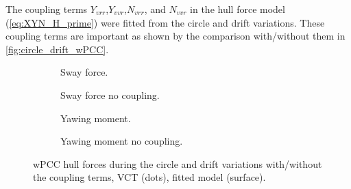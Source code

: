 The coupling terms $Y_{vrr}$,$Y_{vvr}$,$N_{vrr}$, and $N_{vvr}$ in the hull force model (\autoref{eq:XYN_H_prime}) were fitted from the circle and drift variations. These coupling terms are important as shown by the comparison with/without them in \autoref{fig:circle_drift_wPCC}.
\begin{figure}[h]
     \centering
     \begin{subfigure}[b]{0.49\textwidth}
         \centering
         
        \caption{Sway force.}
        \label{fig:circle_drift_Y_H_wPCC}
     \end{subfigure}
     \hfill
     \begin{subfigure}[b]{0.49\textwidth}
         \centering
         
        \caption{Sway force no coupling.}
        \label{fig:circle_drift_Y_H_no_coupling_wPCC}
     \end{subfigure}

     \vfill
     \begin{subfigure}[b]{0.49\textwidth}
         \centering
         
        \caption{Yawing moment.}
        \label{fig:circle_drift_N_H_wPCC}
     \end{subfigure}
     \hfill
     \begin{subfigure}[b]{0.49\textwidth}
         \centering
         
        \caption{Yawing moment no coupling.}
        \label{fig:circle_drift_N_H_no_coupling_wPCC}
     \end{subfigure}
     
    \caption{wPCC hull forces during the circle and drift variations with/without the coupling terms, VCT (dots), fitted model (surface).}
    \label{fig:circle_drift_wPCC}
\end{figure}
